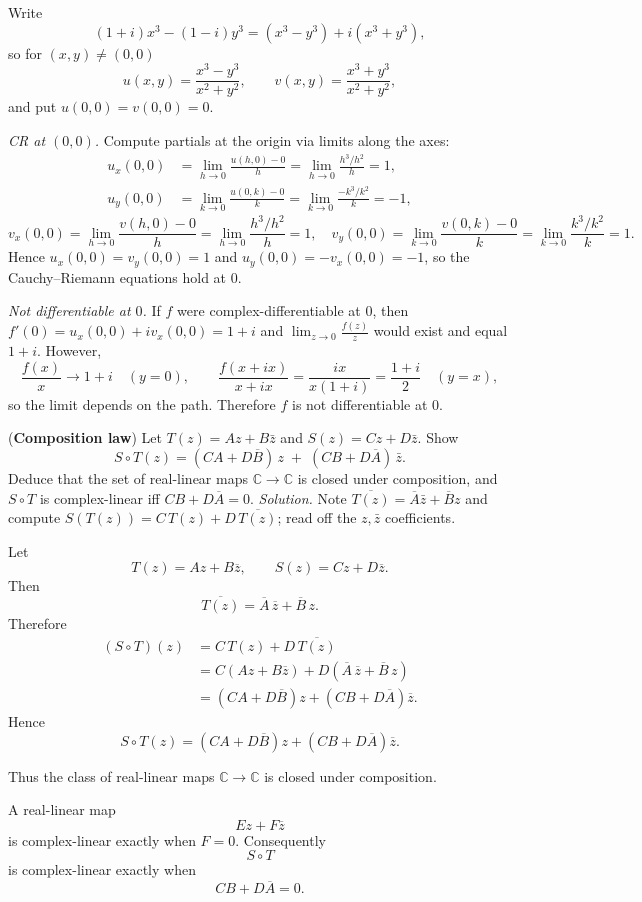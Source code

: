 \begin{solution}
Write
\[
(1+i)x^3-(1-i)y^3=(x^3-y^3)+i(x^3+y^3),
\]
so for $(x,y)\neq(0,0)$
\[
u(x,y)=\frac{x^3-y^3}{x^2+y^2},\qquad
v(x,y)=\frac{x^3+y^3}{x^2+y^2},
\]
and put $u(0,0)=v(0,0)=0$.

\emph{CR at $(0,0)$.}
Compute partials at the origin via limits along the axes:
\[
\begin{aligned}
u_x(0,0)&=\lim_{h\to0}\frac{u(h,0)-0}{h}
=\lim_{h\to0}\frac{h^3/h^2}{h}=1,\\
u_y(0,0)&=\lim_{k\to0}\frac{u(0,k)-0}{k}
=\lim_{k\to0}\frac{-k^3/k^2}{k}=-1,
\end{aligned}
\]
\[
v_x(0,0)=\lim_{h\to0}\frac{v(h,0)-0}{h}
=\lim_{h\to0}\frac{h^3/h^2}{h}=1,\quad
v_y(0,0)=\lim_{k\to0}\frac{v(0,k)-0}{k}
=\lim_{k\to0}\frac{k^3/k^2}{k}=1.
\]
Hence $u_x(0,0)=v_y(0,0)=1$ and $u_y(0,0)=-v_x(0,0)=-1$, so the Cauchy--Riemann equations hold at $0$.

\emph{Not differentiable at $0$.}
If $f$ were complex-differentiable at 0, then $f'(0)=u_x(0,0)+i v_x(0,0)=1+i$ and
$\displaystyle \lim_{z\to0}\frac{f(z)}{z}$ would exist and equal $1+i$.
However,
\[
\frac{f(x)}{x}\to 1+i\quad(y=0),\qquad
\frac{f(x+ix)}{x+ix}=\frac{i x}{x(1+i)}=\frac{1+i}{2}\quad(y=x),
\]
so the limit depends on the path. Therefore $f$ is not differentiable at $0$.
\end{solution}

\begin{problem}[CP-IV-0081]
\label{prob:cp-iv-0081}
\par\noindent\textbullet\quad (\textbf{Composition law})
	Let $T(z)=Az+B\bar z$ and $S(z)=Cz+D\bar z$. Show
	\[
	S\circ T(z)=(CA+D\overline{B})\,z\;+\;(CB+D\overline{A})\,\bar z.
	\]
	Deduce that the set of real-linear maps $\mathbb{C}\to\mathbb{C}$ is closed under composition, and $S\circ T$ is complex-linear iff $CB+D\overline{A}=0$.
	\emph{Solution.} Note $\overline{T(z)}=\overline{A}\bar z+\overline{B}z$ and compute
	$S(T(z))=C\,T(z)+D\,\overline{T(z)}$; read off the $z,\bar z$ coefficients.
\end{problem}

\begin{solution}
Let
\[
T(z)=Az+B\overline z,
\qquad
S(z)=Cz+D\overline z.
\]
Then
\[
\overline{T(z)}
=
\overline A\,\overline z+\overline B\,z.
\]
Therefore
\[
\begin{aligned}
(S\circ T)(z)
&=
C\,T(z)+D\,\overline{T(z)}\\
&=
C(Az+B\overline z)
+
D(\overline A\,\overline z+\overline B\,z)\\
&=
(CA+D\overline B)z
+
(CB+D\overline A)\overline z.
\end{aligned}
\]
Hence
\[
\boxed{
S\circ T(z)
=
(CA+D\overline B)z
+
(CB+D\overline A)\overline z.
}
\]

Thus the class of real-linear maps \(\mathbb C\to\mathbb C\) is closed under composition.

A real-linear map
\[
Ez+F\overline z
\]
is complex-linear exactly when \(F=0\). Consequently
\[
S\circ T
\]
is complex-linear exactly when
\[
\boxed{CB+D\overline A=0}.
\]
\end{solution}


